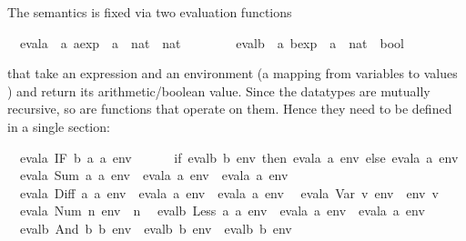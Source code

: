 \begin{isabellebody}
\begin{isamarkuptext}
The semantics is fixed via two evaluation functions%
\end{isamarkuptext}%
\ \ evala\ {\isacharcolon}{\isacharcolon}\ {\isachardoublequote}{\isacharprime}a\ aexp\ {\isasymRightarrow}\ {\isacharparenleft}{\isacharprime}a\ {\isasymRightarrow}\ nat{\isacharparenright}\ {\isasymRightarrow}\ nat{\isachardoublequote}\isanewline
\ \ \ \ \ \ \ \ evalb\ {\isacharcolon}{\isacharcolon}\ {\isachardoublequote}{\isacharprime}a\ bexp\ {\isasymRightarrow}\ {\isacharparenleft}{\isacharprime}a\ {\isasymRightarrow}\ nat{\isacharparenright}\ {\isasymRightarrow}\ bool{\isachardoublequote}%
\begin{isamarkuptext}%
\noindent
that take an expression and an environment (a mapping from variables  to values
) and return its arithmetic/boolean
value. Since the datatypes are mutually recursive, so are functions that
operate on them. Hence they need to be defined in a single 
section:%
\end{isamarkuptext}%
\isanewline
\ \ {\isachardoublequote}evala\ {\isacharparenleft}IF\ b\ a{}\ a{}{\isacharparenright}\ env\ {\isacharequal}\isanewline
\ \ \ \ \ {\isacharparenleft}if\ evalb\ b\ env\ then\ evala\ a{}\ env\ else\ evala\ a{}\ env{\isacharparenright}{\isachardoublequote}\isanewline
\ \ {\isachardoublequote}evala\ {\isacharparenleft}Sum\ a{}\ a{}{\isacharparenright}\ env\ {\isacharequal}\ evala\ a{}\ env\ {\isacharplus}\ evala\ a{}\ env{\isachardoublequote}\isanewline
\ \ {\isachardoublequote}evala\ {\isacharparenleft}Diff\ a{}\ a{}{\isacharparenright}\ env\ {\isacharequal}\ evala\ a{}\ env\ {\isacharminus}\ evala\ a{}\ env{\isachardoublequote}\isanewline
\ \ {\isachardoublequote}evala\ {\isacharparenleft}Var\ v{\isacharparenright}\ env\ {\isacharequal}\ env\ v{\isachardoublequote}\isanewline
\ \ {\isachardoublequote}evala\ {\isacharparenleft}Num\ n{\isacharparenright}\ env\ {\isacharequal}\ n{\isachardoublequote}\isanewline
\isanewline
\ \ {\isachardoublequote}evalb\ {\isacharparenleft}Less\ a{}\ a{}{\isacharparenright}\ env\ {\isacharequal}\ {\isacharparenleft}evala\ a{}\ env\ {\isacharless}\ evala\ a{}\ env{\isacharparenright}{\isachardoublequote}\isanewline
\ \ {\isachardoublequote}evalb\ {\isacharparenleft}And\ b{}\ b{}{\isacharparenright}\ env\ {\isacharequal}\ {\isacharparenleft}evalb\ b{}\ env\ {\isasymand}\ evalb\ b{}\ env{\isacharparenright}{\isachardoublequote}\isanewline

\end{isabellebody}

